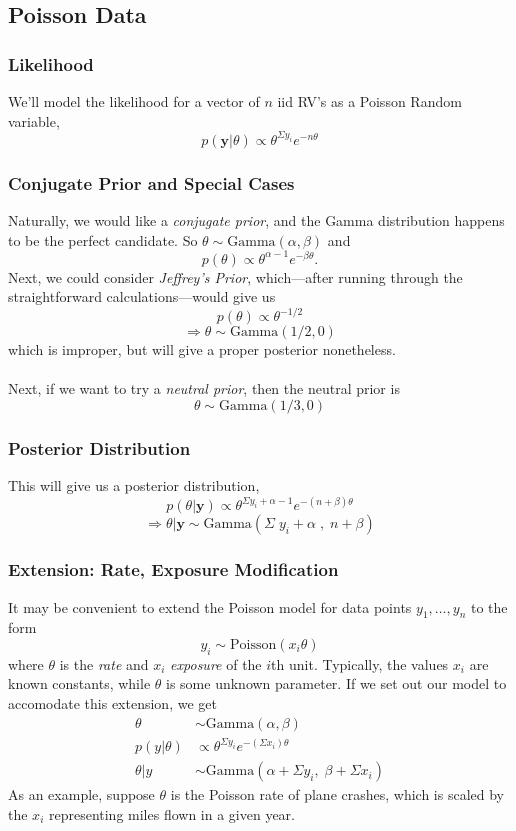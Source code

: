 \documentclass[a4paper,12pt]{scrartcl}
\begin{document}
\newpage
\subsection{Poisson Data}

\subsubsection{Likelihood}

We'll model the likelihood for a vector of $n$ iid RV's as a
Poisson Random variable,
   \[ p(\mathbf{y} | \theta) \propto \theta^{\Sigma y_i} e^{-n\theta} \]
   
\subsubsection{Conjugate Prior and Special Cases}

Naturally, we would like a \emph{conjugate prior}, and the Gamma 
distribution
happens to be the perfect candidate. 
So $\theta \sim \text{Gamma}(\alpha,
\beta)$ and
   \[ p(\theta) \propto \theta^{\alpha - 1} e^{-\beta \theta}.\]
Next, we could consider \emph{Jeffrey's Prior}, 
which---after running through
the straightforward calculations---would give us
   \[ p(\theta) \propto \theta^{-1/2} \]
   \[ \Rightarrow \theta \sim \text{Gamma}(1/2, 0) \]
which is improper, but will give a proper posterior nonetheless.
\\
\\
Next, if we want to try a \emph{neutral prior}, then the neutral prior
is
   \[ \theta \sim \text{Gamma}(1/3, 0) \]


\subsubsection{Posterior Distribution}

This will give us a posterior distribution,
   \[ p(\theta | \mathbf{y}) \propto \theta^{ \Sigma y_i + \alpha
      - 1} e^{-(n+ \beta) \theta} \]
   \[ \Rightarrow \theta | \mathbf{y} \sim \text{Gamma}( \Sigma \; y_i
      + \alpha \; , \; n + \beta ) \]


\subsubsection{Extension: Rate, Exposure Modification} 
It may be convenient to extend
the Poisson model for data points $y_1, \ldots, y_n$ to the form
   \[ y_i \sim \text{Poisson}(x_i\theta) \]
where $\theta$ is the \emph{rate} and $x_i$ \emph{exposure} of the 
$i$th unit. Typically, the values $x_i$ are known constants, while
$\theta$ is some unknown parameter. If we set out our model to 
accomodate this extension, we get
\begin{align*}
   \theta &\sim \text{Gamma}(\alpha, \beta) \\
   p(y|\theta) &\propto \theta^{\Sigma y_i} e^{-(\Sigma x_i)\theta}\\
   \theta | y &\sim \text{Gamma}\left( \alpha + \Sigma y_i, \; 
      \beta + \Sigma x_i\right)
\end{align*}
As an example, suppose $\theta$ is the Poisson rate of plane crashes,
which is scaled by the $x_i$ representing miles flown in a given year.
\end{document}
